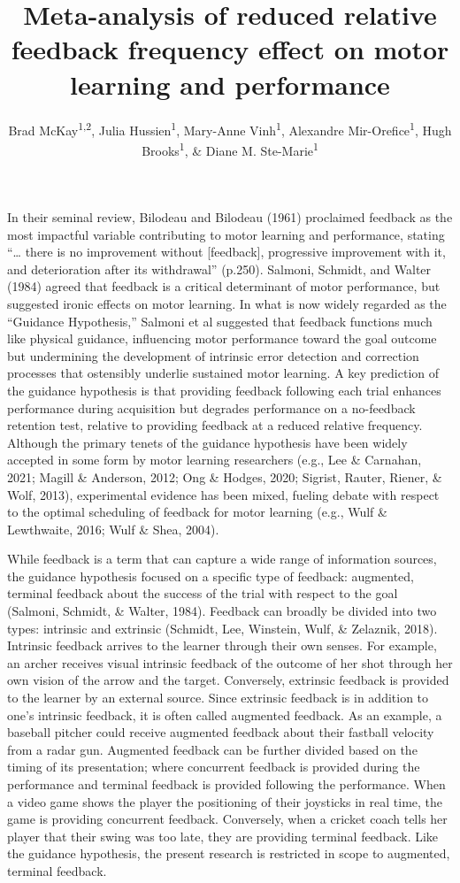 \documentclass[
  english,
  man,mask,floatsintext]{apa7}
\title{Meta-analysis of reduced relative feedback frequency effect on motor learning and performance}
\author{Brad McKay\textsuperscript{1,2}, Julia Hussien\textsuperscript{1}, Mary-Anne Vinh\textsuperscript{1}, Alexandre Mir-Orefice\textsuperscript{1}, Hugh Brooks\textsuperscript{1}, \& Diane M. Ste-Marie\textsuperscript{1}}
\date{}
\affiliation{\vspace{0.5cm}\textsuperscript{1} School of Human Kinetics, University of Ottawa\\\textsuperscript{2} Department of Kinesiology, McMaster University}
\begin{document}
\maketitle

In their seminal review, Bilodeau and Bilodeau (1961) proclaimed feedback as the most impactful variable contributing to motor learning and performance, stating ``\ldots{} there is no improvement without {[}feedback{]}, progressive improvement with it, and deterioration after its withdrawal'' (p.250). Salmoni, Schmidt, and Walter (1984) agreed that feedback is a critical determinant of motor performance, but suggested ironic effects on motor learning. In what is now widely regarded as the ``Guidance Hypothesis,'' Salmoni et al suggested that feedback functions much like physical guidance, influencing motor performance toward the goal outcome but undermining the development of intrinsic error detection and correction processes that ostensibly underlie sustained motor learning. A key prediction of the guidance hypothesis is that providing feedback following each trial enhances performance during acquisition but degrades performance on a no-feedback retention test, relative to providing feedback at a reduced relative frequency. Although the primary tenets of the guidance hypothesis have been widely accepted in some form by motor learning researchers (e.g., Lee \& Carnahan, 2021; Magill \& Anderson, 2012; Ong \& Hodges, 2020; Sigrist, Rauter, Riener, \& Wolf, 2013), experimental evidence has been mixed, fueling debate with respect to the optimal scheduling of feedback for motor learning (e.g., Wulf \& Lewthwaite, 2016; Wulf \& Shea, 2004).

While feedback is a term that can capture a wide range of information sources, the guidance hypothesis focused on a specific type of feedback: augmented, terminal feedback about the success of the trial with respect to the goal (Salmoni, Schmidt, \& Walter, 1984). Feedback can broadly be divided into two types: intrinsic and extrinsic (Schmidt, Lee, Winstein, Wulf, \& Zelaznik, 2018). Intrinsic feedback arrives to the learner through their own senses. For example, an archer receives visual intrinsic feedback of the outcome of her shot through her own vision of the arrow and the target. Conversely, extrinsic feedback is provided to the learner by an external source. Since extrinsic feedback is in addition to one's intrinsic feedback, it is often called augmented feedback. As an example, a baseball pitcher could receive augmented feedback about their fastball velocity from a radar gun. Augmented feedback can be further divided based on the timing of its presentation; where concurrent feedback is provided during the performance and terminal feedback is provided following the performance. When a video game shows the player the positioning of their joysticks in real time, the game is providing concurrent feedback. Conversely, when a cricket coach tells her player that their swing was too late, they are providing terminal feedback. Like the guidance hypothesis, the present research is restricted in scope to augmented, terminal feedback.
\end{document}
